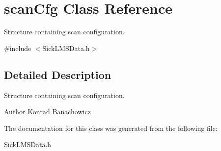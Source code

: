 \hypertarget{classscanCfg}{\section{scan\-Cfg Class Reference}
\label{classscanCfg}
}


Structure containing scan configuration.  




{\ttfamily \#include $<$Sick\-L\-M\-S\-Data.\-h$>$}



\subsection{Detailed Description}
Structure containing scan configuration. 

\begin{DoxyAuthor}{Author}
Konrad Banachowicz 
\end{DoxyAuthor}


The documentation for this class was generated from the following file\-:\begin{DoxyCompactItemize}
\item 
Sick\-L\-M\-S\-Data.\-h\end{DoxyCompactItemize}
